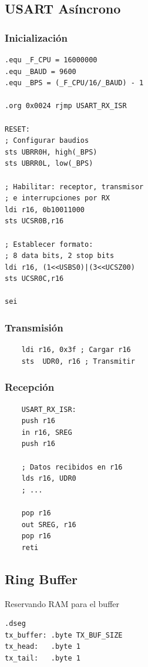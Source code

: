 
\subsection{USART Asíncrono}\label{anexo:USART_Asincrono}
    \subsubsection{Inicialización}
    \begin{verbatim}
.equ _F_CPU = 16000000
.equ _BAUD = 9600
.equ _BPS = (_F_CPU/16/_BAUD) - 1

.org 0x0024 rjmp USART_RX_ISR

RESET:
; Configurar baudios
sts UBRR0H, high(_BPS)
sts UBRR0L, low(_BPS)

; Habilitar: receptor, transmisor
; e interrupciones por RX
ldi r16, 0b10011000
sts UCSR0B,r16

; Establecer formato:
; 8 data bits, 2 stop bits
ldi r16, (1<<USBS0)|(3<<UCSZ00)
sts UCSR0C,r16

sei
    \end{verbatim}
    \subsubsection{Transmisión}
    \begin{verbatim}
    ldi r16, 0x3f ; Cargar r16 
    sts  UDR0, r16 ; Transmitir
    \end{verbatim}
    \subsubsection{Recepción}

    \begin{verbatim}
    USART_RX_ISR:
    push r16 
    in r16, SREG 
    push r16 

    ; Datos recibidos en r16
    lds r16, UDR0
    ; ...

    pop r16
    out SREG, r16
    pop r16	
    reti
    \end{verbatim}

\subsection{Ring Buffer}\label{anexo:Ring_Buffer}

Reservando RAM para el buffer
\begin{verbatim}
.dseg 
tx_buffer: .byte TX_BUF_SIZE  
tx_head:   .byte 1            
tx_tail:   .byte 1
\end{verbatim}

